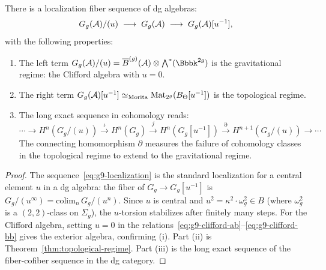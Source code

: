 \begin{theorem}
\label{thm:localization-sequence}
There is a localization fiber sequence of dg algebras:
\begin{equation}\label{eq:g9-localization}
G_g(\mathcal{A})/(u)
\;\longrightarrow\;
G_g(\mathcal{A})
\;\longrightarrow\;
G_g(\mathcal{A})[u^{-1}],
\end{equation}
with the following properties:
\begin{enumerate}[label=\textup{(\roman*)}]
\item The left term $G_g(\cA)/(u) = \barB^{(g)}(\cA) \otimes
\bigwedge^*(\Bbbk^{2g})$ is the gravitational regime:
the Clifford algebra with $u = 0$.

\item The right term $G_g(\mathcal{A})[u^{-1}] \simeq_{\mathrm{Morita}}
\mathrm{Mat}_{2^g}(B_\Theta[u^{-1}])$ is the topological regime.

\item The long exact sequence in cohomology reads:
\begin{equation}\label{eq:g9-localization-les}
\cdots \to
H^n(G_g/(u)) \xrightarrow{\iota}
H^n(G_g) \xrightarrow{j}
H^n(G_g[u^{-1}]) \xrightarrow{\partial}
H^{n+1}(G_g/(u)) \to \cdots
\end{equation}
The connecting homomorphism $\partial$ measures the failure of
cohomology classes in the topological regime to extend to the
gravitational regime.
\end{enumerate}
\end{theorem}

\begin{proof}
The sequence~\eqref{eq:g9-localization} is the standard localization
for a central element $u$ in a dg algebra: the fiber of
$G_g \to G_g[u^{-1}]$ is $G_g/(u^\infty) = \mathrm{colim}_n\,
G_g/(u^n)$. Since $u$ is central and $u^2 = \kappa^2 \cdot \omega_g^2
\in B$ (where $\omega_g^2$ is a $(2,2)$-class on $\Sigma_g$), the
$u$-torsion stabilizes after finitely many steps. For the Clifford
algebra, setting $u = 0$ in the
relations~\eqref{eq:g9-clifford-ab}--\eqref{eq:g9-clifford-bb} gives
the exterior algebra, confirming (i). Part (ii) is
Theorem~\ref{thm:topological-regime}. Part (iii) is the long exact
sequence of the fiber-cofiber sequence in the dg category.
\end{proof}

